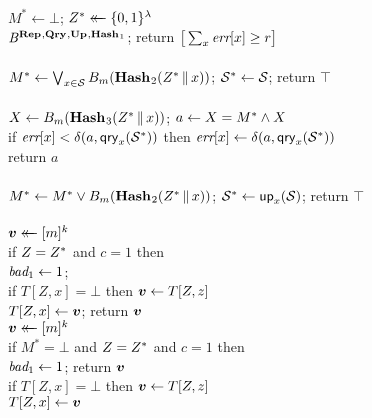 \begin{figure*}
{
  \vspace{-7pt}
      \hfill {}\\[2pt]
    $M^* \gets \bot$;
    $Z^* \mathrel{\leftarrow\mkern-14mu\leftarrow} \{0,1\}^\lambda$\\
    $\mathit{B}^{\textup{\textbf{Rep}}\hspace{0.5pt},\textup{\textbf{Qry}}\hspace{0.5pt},\textup{\textbf{Up}}\hspace{0.5pt},\textup{\textbf{Hash}}\hspace{0.5pt}_1}$;
    return $\big[\sum_x \textit{err}[x] \geq r\big]$
  \\[6pt]
  \oraclev{$\REPO(\col)$}\\[2pt]
    $M^* \gets \bigvee_{x \in \mathcal{S}} {B}_m(\textup{\textbf{Hash}}\hspace{0.5pt}_2(Z^* \, \| \, x))$;
    $\mathcal{S}^* \gets \mathcal{S}$;
    return $\top$
  \\[6pt]
  \\[2pt]
    $X \gets {B}_m(\textup{\textbf{Hash}}\hspace{0.5pt}_3(Z^* \, \| \, x))$;
    $a \gets X = M^* \wedge X$\\
    if $\textit{err}[x] < \delta(a,\mathsf{qry}_x(\mathcal{S}^*))$ then
          $\textit{err}[x] \gets \delta(a,\mathsf{qry}_x(\mathcal{S}^*))$\\
    return $a$
  \\[6pt]
  \\[2pt]
    $M^* \gets M^* \vee {B}_m(\textup{\textbf{Hash}}\hspace{0.5pt}_2(Z^* \, \| \, x))$;
    $\mathcal{S}^* \gets \mathsf{up}_x(\mathcal{S})$;
    return $\top$
  \\[6pt]
  \\[2pt]
    $\boldsymbol{v} \mathrel{\leftarrow\mkern-14mu\leftarrow} [m]^k$\\
    if $Z=Z^*$ and $c = 1$ then \\
    \tab $\textit{bad}_1 \gets 1$; \\
    if $T[Z,x] = \bot$ then $\boldsymbol{v} \gets T[Z,z]$\\
    $T[Z,x] \gets \boldsymbol{v}$; return $\boldsymbol{v}$
}
{
  \vspace{-2pt}
  \\[2pt]
    $\boldsymbol{v} \mathrel{\leftarrow\mkern-14mu\leftarrow} [m]^k$\\
    if $M^*=\bot$ and $Z=Z^*$ and $c=1$ then\\
    \tab $\textit{bad}_1 \gets 1$; return $\boldsymbol{v}$\\
    if $T[Z,x] = \bot$ then $\boldsymbol{v} \gets T[Z,z]$\\
    $T[Z,x] \gets \boldsymbol{v}$\\[2pt]
    }
\end{figure*}
